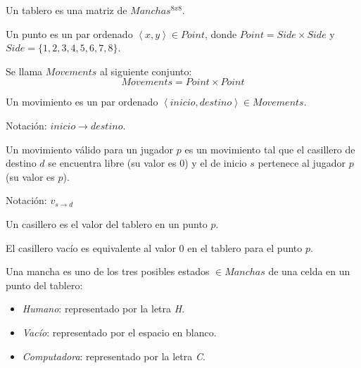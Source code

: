 \documentclass[10pt,a4paper,notitlepage,twocolumn,draft]{article}
\newenvironment{definition}[1][Definición]{\begin{trivlist}
\item[\hskip \labelsep {\bfseries #1}]}{\end{trivlist}}
\begin{document}
\begin{definition}Un tablero es una matriz de $Manchas^{8x8}$.\end{definition}

\begin{definition}
Un punto es un par ordenado $\left\langle x, y\right\rangle \in Point$, donde $Point = Side \times Side$ y $Side = \{1, 2, 3, 4, 5, 6, 7, 8\}$.
\end{definition}

\begin{definition}
Se llama $Movements$ al siguiente conjunto:
\begin{equation}
Movements = Point \times Point
\end{equation}
\end{definition}

\begin{definition}
Un movimiento es un par ordenado $\left\langle inicio, destino\right\rangle \in Movements$.

Notación: $inicio \rightarrow destino$.
\end{definition}

\begin{definition}
Un movimiento válido para un jugador $p$ es un movimiento tal que el casillero de destino $d$ se encuentra libre (su valor es $0$) y el de inicio $s$ pertenece al jugador $p$ (su valor es $p$).

Notación: $v_{s \rightarrow d}$
\end{definition}

\begin{definition}
Un casillero es el valor del tablero en un punto $p$.
\end{definition}

\begin{definition}
El casillero vacío es equivalente al valor $0$ en el tablero para el punto $p$.
\end{definition}

\begin{definition}
Una mancha es uno de los tres posibles estados $\in Manchas$ de una celda en un punto del tablero:
\begin{itemize}
\item[-1] \emph{Humano}: representado por la letra \textit{H}.
\item[0] \emph{Vacío}: representado por el espacio en blanco.
\item[1] \emph{Computadora}: representado por la letra \textit{C}.
\end{itemize}
\end{definition}
\end{document}
